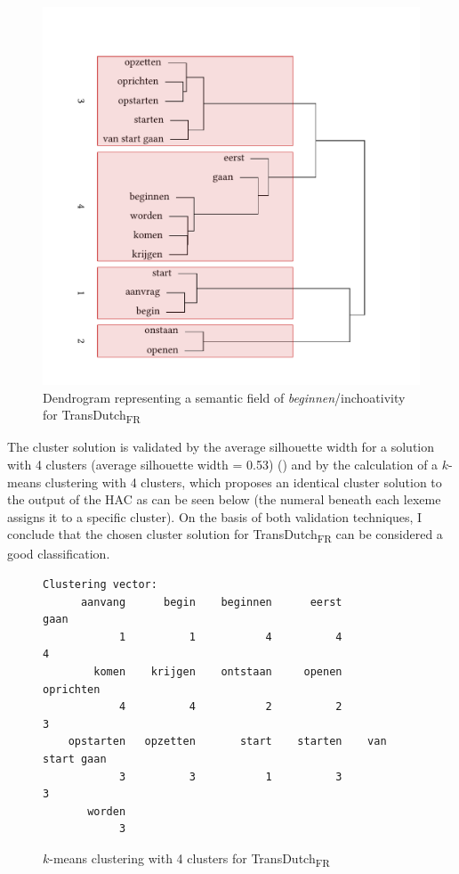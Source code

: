 \begin{figure}
\includegraphics[width=.75\textwidth,trim=0 20 0 20]{figures/tree78.pdf}
\caption{\label{fig:4:76}Dendrogram representing a semantic field of \textit{beginnen}/inchoativity for TransDutch\textsubscript{FR}}
\end{figure}

The cluster solution is validated by the average silhouette width for a solution with 4 clusters (average silhouette width = 0.53) () and by the calculation of a $k$-means clustering with 4 clusters, which proposes an identical cluster solution to the output of the HAC as can be seen below (the numeral beneath each lexeme assigns it to a specific cluster). On the basis of both validation techniques, I conclude that the chosen cluster solution for TransDutch\textsubscript{FR} can be considered a good classification.

\begin{figure}
\begin{lstlisting}
Clustering vector:
      aanvang      begin    beginnen      eerst              gaan 
            1          1           4          4                 4
        komen    krijgen    ontstaan     openen         oprichten
            4          4           2          2                 3
    opstarten   opzetten       start    starten    van start gaan
            3          3           1          3                 3
       worden               
            3               
\end{lstlisting}
\caption{\label{fig:4:kmeansdutch4}$k$-means clustering with 4 clusters for TransDutch\textsubscript{FR}}
\end{figure}

